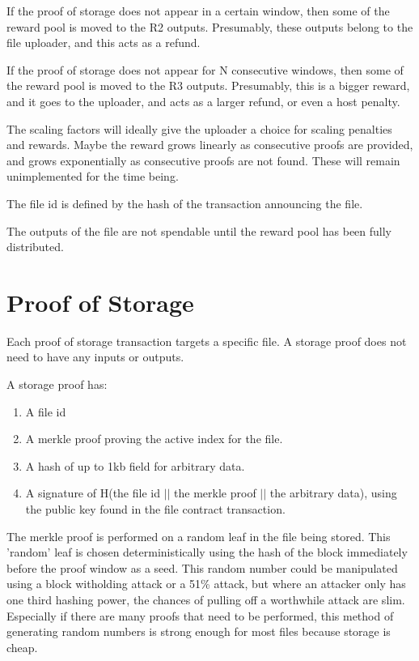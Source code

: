 \documentclass[twocolumn]{article}
\begin{document}
If the proof of storage does not appear in a certain window, then some of the reward pool is moved to the R2 outputs.
Presumably, these outputs belong to the file uploader, and this acts as a refund.

If the proof of storage does not appear for N consecutive windows, then some of the reward pool is moved to the R3 outputs.
Presumably, this is a bigger reward, and it goes to the uploader, and acts as a larger refund, or even a host penalty.

The scaling factors will ideally give the uploader a choice for scaling penalties and rewards. Maybe the reward grows linearly as consecutive proofs are provided, and grows exponentially as consecutive proofs are not found. These will remain unimplemented for the time being.

The file id is defined by the hash of the transaction announcing the file.

The outputs of the file are not spendable until the reward pool has been fully distributed.

\section{Proof of Storage}
Each proof of storage transaction targets a specific file.
A storage proof does not need to have any inputs or outputs.

A storage proof has:
\begin{enumerate}
	\item A file id
	\item A merkle proof proving the active index for the file.
	\item A hash of up to 1kb field for arbitrary data.
	\item A signature of H(the file id $||$ the merkle proof $||$ the arbitrary data), using the public key found in the file contract transaction.
\end{enumerate}

The merkle proof is performed on a random leaf in the file being stored.
This 'random' leaf is chosen deterministically using the hash of the block immediately before the proof window as a seed.
This random number could be manipulated using a block witholding attack or a 51\% attack, but where an attacker only has one third hashing power, the chances of pulling off a worthwhile attack are slim.
Especially if there are many proofs that need to be performed, this method of generating random numbers is strong enough for most files because storage is cheap.
\end{document}
